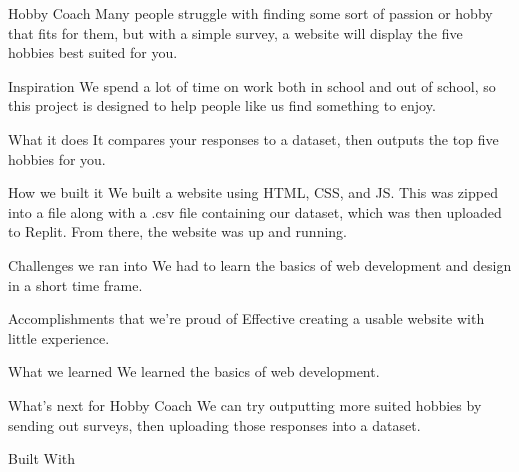 Hobby Coach
Many people struggle with finding some sort of passion or hobby that fits for them, but with a simple survey, a website will display the five hobbies best suited for you.

Inspiration
We spend a lot of time on work both in school and out of school, so this project is designed to help people like us find something to enjoy.

What it does
It compares your responses to a dataset, then outputs the top five hobbies for you.

How we built it
We built a website using HTML, CSS, and JS. This was zipped into a file along with a .csv file containing our dataset, which was then uploaded to Replit. From there, the website was up and running.

Challenges we ran into
We had to learn the basics of web development and design in a short time frame.

Accomplishments that we're proud of
Effective creating a usable website with little experience.

What we learned
We learned the basics of web development.

What's next for Hobby Coach
We can try outputting more suited hobbies by sending out surveys, then uploading those responses into a dataset.

Built With
